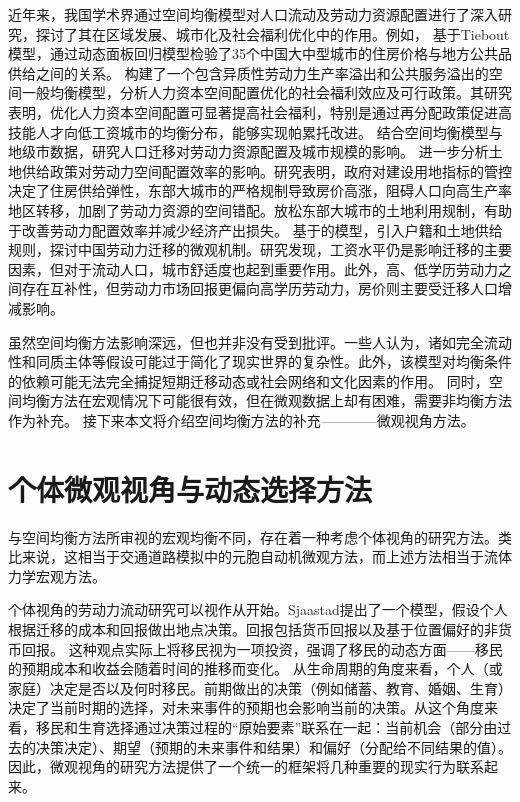 \documentclass[a4paper,12pt,oneside, fontset=mac]{ctexbook} %
\begin{document}
近年来，我国学术界通过空间均衡模型对人口流动及劳动力资源配置进行了深入研究，探讨了其在区域发展、城市化及社会福利优化中的作用。例如，
\cite{LiangRuoBingDiFangGongGongPinGongGeiZhongDeTieboutMoXingJiYuZhongGuoChengShiFangJieDeJingYanYanJiu2008}基于Tiebout模型，通过动态面板回归模型检验了35个中国大中型城市的住房价格与地方公共品供给之间的关系。
\cite{LiuHuaRenLiZiBenKongJianPeiZhiDeSheHuiFuLiXiaoYingYanJiuJiYuLiangHuaKongJianYiBanJunHengMoXingDeFenXi2024}构建了一个包含异质性劳动力生产率溢出和公共服务溢出的空间一般均衡模型，分析人力资本空间配置优化的社会福利效应及可行政策。其研究表明，优化人力资本空间配置可显著提高社会福利，特别是通过再分配政策促进高技能人才向低工资城市的均衡分布，能够实现帕累托改进。
\cite{WangLiLiWoGuoRenKouQianYiChengBenChengShiGuiMoYuShengChanLu2020}结合空间均衡模型与地级市数据，研究人口迁移对劳动力资源配置及城市规模的影响。
\cite{WangLiLiTuDiGongGeiFangJieYuLaoDongLiKongJianPeiZhiXiaoLu2023}进一步分析土地供给政策对劳动力空间配置效率的影响。研究表明，政府对建设用地指标的管控决定了住房供给弹性，东部大城市的严格规制导致房价高涨，阻碍人口向高生产率地区转移，加剧了劳动力资源的空间错配。放松东部大城市的土地利用规制，有助于改善劳动力配置效率并减少经济产出损失。
\cite{ZhaoFangZhongGuoChengShiHuaFaZhanJiYuKongJianJunHengMoXingDeYanJiu2017}基于\cite{diamondDeterminantsWelfareImplications2016}的模型，引入户籍和土地供给规则，探讨中国劳动力迁移的微观机制。研究发现，工资水平仍是影响迁移的主要因素，但对于流动人口，城市舒适度也起到重要作用。此外，高、低学历劳动力之间存在互补性，但劳动力市场回报更偏向高学历劳动力，房价则主要受迁移人口增减影响。

虽然空间均衡方法影响深远，但也并非没有受到批评。一些人认为，诸如完全流动性和同质主体等假设可能过于简化了现实世界的复杂性。此外，该模型对均衡条件的依赖可能无法完全捕捉短期迁移动态或社会网络和文化因素的作用。
同时，空间均衡方法在宏观情况下可能很有效，但在微观数据上却有困难，需要非均衡方法作为补充。
接下来本文将介绍空间均衡方法的补充————微观视角方法。


\section{个体微观视角与动态选择方法}

与空间均衡方法所审视的宏观均衡不同，存在着一种考虑个体视角的研究方法。类比来说，这相当于交通道路模拟中的元胞自动机微观方法，而上述方法相当于流体力学宏观方法。

个体视角的劳动力流动研究可以视作从\cite{sjaastadCostsReturnsHuman1962}开始。Sjaastad提出了一个模型，假设个人根据迁移的成本和回报做出地点决策。回报包括货币回报以及基于位置偏好的非货币回报。
这种观点实际上将移民视为一项投资，强调了移民的动态方面——移民的预期成本和收益会随着时间的推移而变化。
从生命周期的角度来看，个人（或家庭）决定是否以及何时移民。前期做出的决策（例如储蓄、教育、婚姻、生育）决定了当前时期的选择，对未来事件的预期也会影响当前的决策。从这个角度来看，移民和生育选择通过决策过程的“原始要素”联系在一起：当前机会（部分由过去的决策决定）、期望（预期的未来事件和结果）和偏好（分配给不同结果的值）。因此，微观视角的研究方法提供了一个统一的框架将几种重要的现实行为联系起来。
\end{document}

